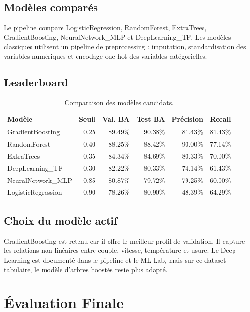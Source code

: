 \documentclass[12pt,a4paper]{report}
\begin{document}
\section{Modèles comparés}
Le pipeline compare LogisticRegression, RandomForest, ExtraTrees, GradientBoosting, NeuralNetwork\_MLP et DeepLearning\_TF. Les modèles classiques utilisent un pipeline de preprocessing : imputation, standardisation des variables numériques et encodage one-hot des variables catégorielles.

\section{Leaderboard}
\begin{table}[H]
\centering
\small
\begin{tabular}{lrrrrr}
\toprule
\textbf{Modèle} & \textbf{Seuil} & \textbf{Val. BA} & \textbf{Test BA} & \textbf{Précision} & \textbf{Recall} \\
\midrule
GradientBoosting & 0.25 & 89.49\% & 90.38\% & 81.43\% & 81.43\% \\
RandomForest & 0.40 & 88.25\% & 88.42\% & 90.00\% & 77.14\% \\
ExtraTrees & 0.35 & 84.34\% & 84.69\% & 80.33\% & 70.00\% \\
DeepLearning\_TF & 0.30 & 82.22\% & 80.33\% & 74.14\% & 61.43\% \\
NeuralNetwork\_MLP & 0.85 & 80.87\% & 79.72\% & 79.25\% & 60.00\% \\
LogisticRegression & 0.90 & 78.26\% & 80.90\% & 48.39\% & 64.29\% \\
\bottomrule
\end{tabular}
\caption{Comparaison des modèles candidats.}
\end{table}

\section{Choix du modèle actif}
GradientBoosting est retenu car il offre le meilleur profil de validation. Il capture les relations non linéaires entre couple, vitesse, température et usure. Le Deep Learning est documenté dans le pipeline et le ML Lab, mais sur ce dataset tabulaire, le modèle d'arbres boostés reste plus adapté.

\chapter{Évaluation Finale}
\end{document}

